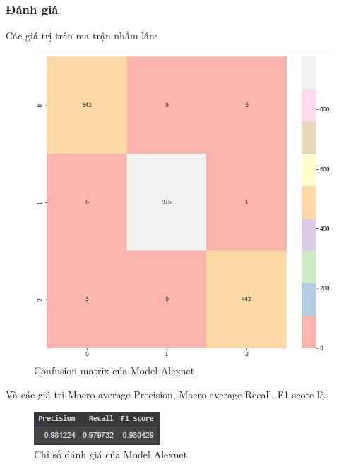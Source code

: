 \subsubsection{Đánh giá}
Các giá trị trên ma trận nhầm lẫn:
\begin{center}
    \begin{figure}[!h]
        \centering
        \includegraphics[scale = 0.4]{fileanh/35.png}
        \caption{Confusion matrix của Model Alexnet}
    \end{figure}
\end{center}
Và các giá trị Macro average Precision, Macro average Recall, F1-score là:
\begin{center}
    \begin{figure}[!h]
        \centering
        \includegraphics[scale = 2]{fileanh/36.jpg}
        \caption{Chỉ số đánh giá của Model Alexnet}
    \end{figure}
\end{center}

    
\newpage







